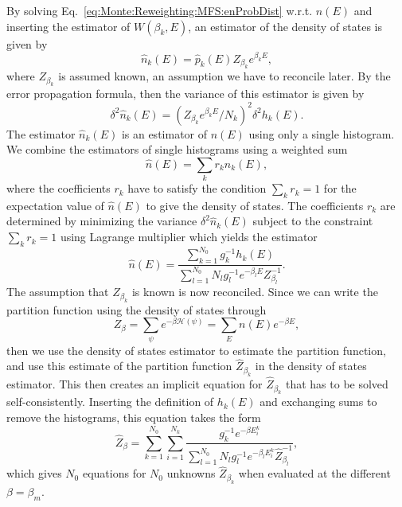 By solving Eq.~\eqref{eq:Monte:Reweighting:MFS:enProbDist} w.r.t. $n(E)$ and inserting the estimator of $W(\beta_k,E)$, an estimator of the density of states is given by
\begin{equation}
    \label{eq:Monte:Reweighting:MFS:DOSEstimator}
    \hat{n}_k(E) = \hat{p}_k(E)Z_{\beta_k}e^{\beta_kE},
\end{equation}
where $Z_{\beta_k}$ is assumed known, an assumption we have to reconcile later. By the error propagation formula, then the variance of this estimator is given by
\begin{equation}
    \label{eq:Monte:Reweighting:MFS:DOSVariance}
    \delta^2\hat{n}_k(E) = (Z_{\beta_k}e^{\beta_kE}/N_k)^2\delta^2h_k(E).
\end{equation}
The estimator $\hat{n}_k(E)$ is an estimator of $n(E)$ using only a single histogram. We combine the estimators of single histograms using a weighted sum
\begin{equation}
    \label{eq:Monte:Reweighting:MFS:DOSWeightedEstimator}
    \hat{n}(E) = \sum_kr_k\hat{n}_k(E),
\end{equation}
where the coefficients $r_k$ have to satisfy the condition $\sum_kr_k = 1$ for the expectation value of $\hat{n}(E)$ to give the density of states. The coefficients
$r_k$ are determined by minimizing the variance $\delta^2\hat{n}_k(E)$ subject to the constraint $\sum_kr_k=1$ using Lagrange multiplier which yields the estimator
\begin{equation}
    \label{eq:Monte:Reweighting:MFS:minimizedDOSWeightedEstimator}
    \hat{n}(E) = \frac{\sum_{k=1}^{N_0}g_k^{-1}h_k(E)}{\sum_{l=1}^{N_0}N_lg_l^{-1}e^{-\beta_lE}Z_{\beta_l}^{-1}}.
\end{equation}
The assumption that $Z_{\beta_k}$ is known is now reconciled. Since we can write the partition function using the density of states through
\begin{equation}
    \label{eq:Monte:Reweighting:MFS:partitionFunctionDOS}
    Z_\beta = \sum_\psi e^{-\beta\mathcal{H}(\psi)} = \sum_En(E)e^{-\beta E},
\end{equation}
then we use the density of states estimator to estimate the partition function, and use this estimate of the partition function $\hat{Z}_{\beta_k}$ in the density
of states estimator. This then creates an implicit equation for $\hat{Z}_{\beta_k}$ that has to be solved self-consistently. Inserting the definition of $h_k(E)$
and exchanging sums to remove the histograms, this equation takes the form
\begin{equation}
    \label{eq:Monte:Reweighting:MFS:selfConsistencyEq}
    \hat{Z}_{\beta} = \sum_{k=1}^{N_0}\sum_{i=1}^{N_k}\frac{g_k^{-1}e^{-\beta E_i^k}}{\sum_{l=1}^{N_0}N_lg_l^{-1}e^{-\beta_lE_i^k}\hat{Z}_{\beta_l}^{-1}},
\end{equation}
which gives $N_0$ equations for $N_0$ unknowns $\hat{Z}_{\beta_k}$ when evaluated at the different $\beta=\beta_m$.

